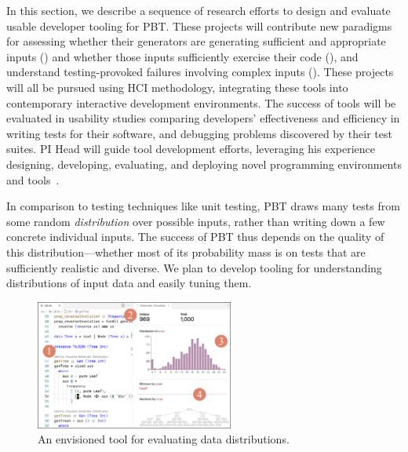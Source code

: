 
In this section, we
describe a sequence of research efforts to design and evaluate usable developer
tooling for PBT. These projects will contribute new paradigms for assessing whether their generators are generating sufficient and
appropriate inputs () and whether those
inputs sufficiently exercise their code (),
and understand testing-provoked failures involving complex inputs
().
%
%
%
These projects will all be pursued using HCI
methodology, integrating these tools into contemporary interactive development
environments. The success of tools will be evaluated in usability studies
comparing developers' effectiveness and efficiency in writing tests for their
software, and debugging problems discovered by their test suites.  PI Head will
guide tool development efforts, leveraging his
experience designing, developing, evaluating, and deploying novel programming
environments and
tools~\cite{ref:head2015tutorons,ref:suzuki2017tracediff,ref:head2017writing,ref:head2018when,ref:head2018interactive,ref:head2019managing,ref:head2020composing}.

%
In comparison to testing techniques like unit testing, PBT draws many
tests from some
random {\em distribution} over possible inputs, rather than writing down a few
concrete individual inputs. The success  of
PBT thus depends on the quality of this distribution---whether
most of its probability mass is on tests that are sufficiently
realistic and diverse. We plan
to develop tooling for
understanding distributions of input data and easily tuning them.

\begin{figure}
  \centering
  \includegraphics[width=0.58\textwidth]{assets/gen-vis.pdf}
  \caption{An envisioned tool for evaluating data distributions.
    }\label{fig:gen-vis}
\end{figure}

